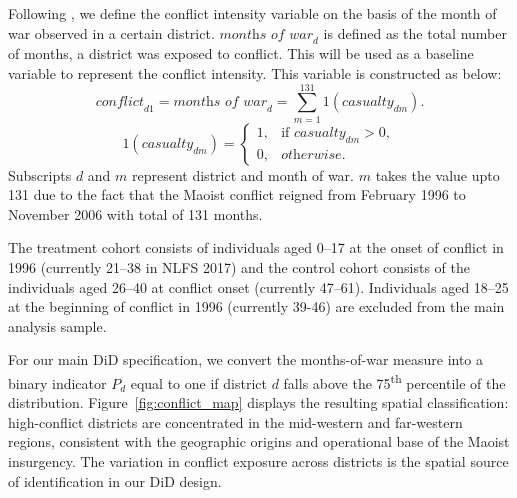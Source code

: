 Following \cite{Bohra-Mishra2011}, we define the conflict intensity variable on the basis of the month of war observed in a certain district. $\textit{months of war}_{d}$ is defined as the total number of months, a district was exposed to conflict. This will be used as a baseline variable to represent the conflict intensity. This variable is constructed as below:
\begin{equation}
\textit{conflict}_{d 1}
=\textit{months of war}_{d}
=\sum_{m=1}^{131} 1(\textit{casualty}_{d m}).
\label{eq:months_of_war}
\end{equation}
\[
1(\textit{casualty}_{dm})=
\begin{cases}
1, & \text{if } \textit{casualty}_{dm}>0,\\
0, & \textit{otherwise.}
\end{cases}
\]
Subscripts $d$ and $m$ represent district and month of war. $m$ takes the value upto 131 due to the fact that the Maoist conflict reigned from February 1996 to November 2006 with total of 131 months.


The treatment cohort consists of individuals aged 0--17 at the onset of conflict in 1996 (currently 21--38 in NLFS 2017) and the control cohort consists of the individuals aged 26--40 at conflict onset (currently 47--61). Individuals aged 18--25 at the beginning of conflict in 1996 (currently 39-46) are excluded from the main analysis sample.







For our main DiD specification, we convert the months-of-war measure into a binary indicator $P_d$ equal to one if district $d$ falls above the 75\textsuperscript{th} percentile of the distribution. Figure~\ref{fig:conflict_map} displays the resulting spatial classification: high-conflict districts are concentrated in the mid-western and far-western regions, consistent with the geographic origins and operational base of the Maoist insurgency. The variation in conflict exposure across districts is the spatial source of identification in our DiD design.



